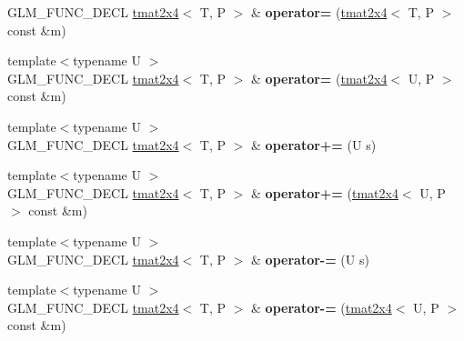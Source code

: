 \begin{DoxyCompactItemize}
\item 
G\+L\+M\+\_\+\+F\+U\+N\+C\+\_\+\+D\+E\+CL \hyperlink{structglm_1_1detail_1_1tmat2x4}{tmat2x4}$<$ T, P $>$ \& {\bfseries operator=} (\hyperlink{structglm_1_1detail_1_1tmat2x4}{tmat2x4}$<$ T, P $>$ const \&m)\hypertarget{structglm_1_1detail_1_1tmat2x4_ac173ba8a4d80a63a46c3d883b9a53833}{}\label{structglm_1_1detail_1_1tmat2x4_ac173ba8a4d80a63a46c3d883b9a53833}

\item 
{\footnotesize template$<$typename U $>$ }\\G\+L\+M\+\_\+\+F\+U\+N\+C\+\_\+\+D\+E\+CL \hyperlink{structglm_1_1detail_1_1tmat2x4}{tmat2x4}$<$ T, P $>$ \& {\bfseries operator=} (\hyperlink{structglm_1_1detail_1_1tmat2x4}{tmat2x4}$<$ U, P $>$ const \&m)\hypertarget{structglm_1_1detail_1_1tmat2x4_a422287398bdb26f5d22bd9e91656889d}{}\label{structglm_1_1detail_1_1tmat2x4_a422287398bdb26f5d22bd9e91656889d}

\item 
{\footnotesize template$<$typename U $>$ }\\G\+L\+M\+\_\+\+F\+U\+N\+C\+\_\+\+D\+E\+CL \hyperlink{structglm_1_1detail_1_1tmat2x4}{tmat2x4}$<$ T, P $>$ \& {\bfseries operator+=} (U s)\hypertarget{structglm_1_1detail_1_1tmat2x4_a5bb3a875e7d771e04ef778dd65c69570}{}\label{structglm_1_1detail_1_1tmat2x4_a5bb3a875e7d771e04ef778dd65c69570}

\item 
{\footnotesize template$<$typename U $>$ }\\G\+L\+M\+\_\+\+F\+U\+N\+C\+\_\+\+D\+E\+CL \hyperlink{structglm_1_1detail_1_1tmat2x4}{tmat2x4}$<$ T, P $>$ \& {\bfseries operator+=} (\hyperlink{structglm_1_1detail_1_1tmat2x4}{tmat2x4}$<$ U, P $>$ const \&m)\hypertarget{structglm_1_1detail_1_1tmat2x4_a298436a3ccd92e48b55bc4b8a39dd778}{}\label{structglm_1_1detail_1_1tmat2x4_a298436a3ccd92e48b55bc4b8a39dd778}

\item 
{\footnotesize template$<$typename U $>$ }\\G\+L\+M\+\_\+\+F\+U\+N\+C\+\_\+\+D\+E\+CL \hyperlink{structglm_1_1detail_1_1tmat2x4}{tmat2x4}$<$ T, P $>$ \& {\bfseries operator-\/=} (U s)\hypertarget{structglm_1_1detail_1_1tmat2x4_a35c469a505e64d85b1903cb8236bb40e}{}\label{structglm_1_1detail_1_1tmat2x4_a35c469a505e64d85b1903cb8236bb40e}

\item 
{\footnotesize template$<$typename U $>$ }\\G\+L\+M\+\_\+\+F\+U\+N\+C\+\_\+\+D\+E\+CL \hyperlink{structglm_1_1detail_1_1tmat2x4}{tmat2x4}$<$ T, P $>$ \& {\bfseries operator-\/=} (\hyperlink{structglm_1_1detail_1_1tmat2x4}{tmat2x4}$<$ U, P $>$ const \&m)\hypertarget{structglm_1_1detail_1_1tmat2x4_a4649ad6c38956df334d0b86042e207bd}{}\label{structglm_1_1detail_1_1tmat2x4_a4649ad6c38956df334d0b86042e207bd}


\end{DoxyCompactItemize}
